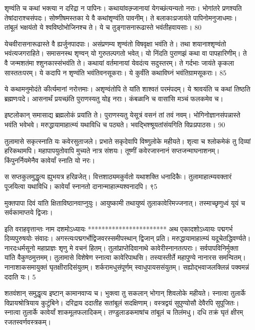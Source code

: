 शृण्वंति च कथां भक्त्या न दरिद्रा न पापिनः।
 कथायांवत्म्र्जानायां येगच्छंत्यन्यतो नराः।
 भोगांतरे प्रणश्यति तेषांदाराश्चसंपदः।
 सोष्णीषमस्तका ये वै कथांशृण्वंति पावनीम्।
 ते बलाकाःप्रजायंते पापिनोमनुजाधमाः।
 तांबूलं भक्षयंतो ये श्वविष्ठोभोजिनश्च ते।
 ये च तुङ्गासनारूढास्ते भवंतीहवायसाः।
 80

  येचवीरासनारूढास्ते वै ह्यर्जुनपादपाः।
 असंप्रणम्य शृण्वंतो विषवृक्षा भवंति ते।
 तथा शयानाश्शृण्वंतो भवंत्यजगराहिते।
 समासनस्थ शृण्वन् यो गुरुतल्पगतो भवेत्।
 यो निंदति पुराणझं कथा वा पापहारिणीम्।
 ते वै जन्मशतंमा श्शुनकास्संभवंति ते।
 कथायां वर्तमानायां येवदंत्य सदुस्तरम्।
 ते गर्दभाः जायंते कृकला सास्ततःपरम्।
 ये कदापि न शृण्वंति भवंतिवनसूकराः।
 ये कुर्वंति कथाविघ्नं भवंतिग्रामसूकराः।
 85

  ये कथामनुमोदंते कीर्त्यमानां नरोत्तमाः।
 अशृण्वंतोपि ते यांति शाश्वतं परमंपदम्।
 ये श्रावयंति च कथां तिष्ठति ब्रह्मणःपदे।
 आसनार्थं प्रयच्छंति पुराणस्यतु योइ नराः।
 कंबळानि च वासांसि मञ्चं फलकमेव च।
 
इष्टलोकान् समासाद्य ब्रह्मलोकं प्रयांति ते।
 पुराणस्यतु येसूत्रं वसनं तां तवं नवम्।
 भोगिनोज्ञानसंपन्नास्ते भवंति भवेभवे।
 मरुद्धायामाहात्म्यं यथाविधि च पठ्यते।
 भवद्भिश्श्रूयतांसंयगिति विप्रःप्रपाठसः।
 90

  तुलामासे सकृत्स्नाति यः कवेरसुताजले।
 प्रभाते सकृदेवापि विष्णुलोके महीयते।
 शृत्वा च श्लोकमेकं तु दिव्यां हरिकथामपि।
 महापापयुतोवापि मुच्यते नात्र संशयः।
 तूष्णीं कवेरजास्नानं सप्तजन्माघनाशनम्।
 किंपुनर्नियमेनैव कावेर्यां स्नाति यो नरः।
 
स सप्तकुलमुद्धृत्य ह्युभयत्र हरिव्रजेत्।
 वित्तशाठ्यमकुर्वतो यथाशक्ति धनादिकैः।
 तुलामाहात्म्यवक्तारं पूजयित्वा यथाविधि।
 कावेर्यां स्नानतो दानान्माहात्म्यश्वनादपि।
 ९5

  मुक्तपापा दिवं यांति क्षिताविष्ठानवाप्नुयुः।
 आयुष्कामी तथायुष्यं तुलाकावेरिमज्जनात्।
 तस्माच्छृणुध्वं यूयं च सर्वकामाप्तये द्विजाः।
 
इति वराहवृत्तान्तः नाम दशमोऽध्यायः
***********************
अथ एकादशोऽध्यायः
पद्मगर्भ दिव्यपुरुषयोः संवादः।
 अगस्त्यःपद्मगर्भोद्विजवरस्समीपस्थान् द्विजान् प्रति।
 मरुद्धायामाहात्म्यं यदूचेतद्धिवर्ण्यते।
 नारदःधर्मसूनो महाप्राज्ञः शृणु मे वचनं हितम्।
 तुलांप्राप्तेदिवानाथे कावेरीस्नानतत्पराः।
 सर्वपापविनिर्मुक्ता यांति वैकुण्ठमुत्तमम्।
 तुलामासे विशेषेण स्नात्वा कावेरिपाथसि।
 तस्यास्तीर्ते महापुण्ये नानारस समन्वितम्।
 नानाशाकसमायुक्तं घृतक्षीरादिसंयुतम्।
 शर्करामधुसंपूर्णम् स्वाधुपायससंयुतम्।
 सह्योद्भवाजलक्लिन्नं पक्वमन्नं ददाति यः।
 5

  शतवंशान् समुद्धृत्य इष्टान् कामानवाप्य च।
 भुक्त्वा तु सकलान् भोगान् शिवलोके महीयते।
 स्नात्वा तुलार्के विप्रायश्रोत्रियाय कुटुंबिने।
 दरिद्राय ददातीह सतांबूलं सदक्षिणाम्।
 वस्त्रद्वयं सुपुण्योसौ देवैरपि सुपूजितः।
 स्नात्वा तुलार्के कावेर्यां शाकमूलफलादिकम्।
 तण्डुलाडकमाषांच तांबूलं च तिलंमधु।
 दधि तक्रं घृतं क्षीरम् रजतस्वर्णवस्त्रकम्।
 
